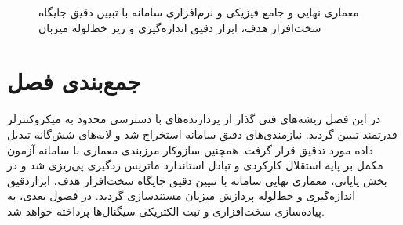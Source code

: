 \begin{figure}[H]
\begin{latin}
\end{latin}
\caption{معماری نهایی و جامع فیزیکی و نرم‌افزاری سامانه با تبیین دقیق جایگاه سخت‌افزار هدف، ابزار دقیق اندازه‌گیری و رپر خط‌لوله میزبان}
\label{fig:final_full_architecture}
\end{figure}

\clearpage
\section{جمع‌بندی فصل}
در این فصل ریشه‌های فنی گذار از پردازنده‌های با دسترسی محدود به میکروکنترلر قدرتمند  تبیین گردید. نیازمندی‌های دقیق سامانه استخراج شد و لایه‌های شش‌گانه تبدیل داده مورد تدقیق قرار گرفت. همچنین سازوکار مرزبندی معماری با سامانه آزمون مکمل بر پایه استقلال کارکردی و تبادل استاندارد ماتریس ردگیری پی‌ریزی شد و در بخش پایانی، معماری نهایی سامانه با تبیین دقیق جایگاه سخت‌افزار هدف، ابزاردقیق اندازه‌گیری و خط‌لوله پردازش میزبان مستندسازی گردید. در فصول بعدی، به پیاده‌سازی سخت‌افزاری و ثبت الکتریکی سیگنال‌ها پرداخته خواهد شد.
